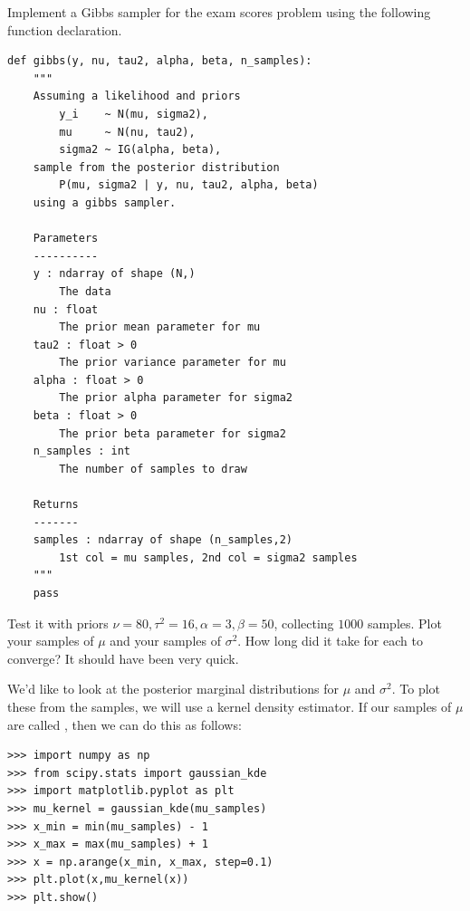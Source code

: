 \begin{problem}
Implement a Gibbs sampler for the exam scores problem using the following function declaration.
\begin{lstlisting}
def gibbs(y, nu, tau2, alpha, beta, n_samples):
    """
    Assuming a likelihood and priors
        y_i    ~ N(mu, sigma2),
        mu     ~ N(nu, tau2),
        sigma2 ~ IG(alpha, beta),
    sample from the posterior distribution
        P(mu, sigma2 | y, nu, tau2, alpha, beta)
    using a gibbs sampler.

    Parameters
    ----------
    y : ndarray of shape (N,)
        The data
    nu : float
        The prior mean parameter for mu
    tau2 : float > 0
        The prior variance parameter for mu
    alpha : float > 0
        The prior alpha parameter for sigma2
    beta : float > 0
        The prior beta parameter for sigma2
    n_samples : int
        The number of samples to draw

    Returns
    -------
    samples : ndarray of shape (n_samples,2)
        1st col = mu samples, 2nd col = sigma2 samples
    """
    pass
\end{lstlisting}
Test it with priors $\nu=80, \tau^{2} = 16, \alpha = 3, \beta = 50$, collecting $1000$ samples. Plot your samples of $\mu$ and your samples of $\sigma^{2}$. How long did it take for each to converge? It should have been very quick.
\end{problem}

We'd like to look at the posterior marginal distributions for $\mu$ and $\sigma^2$.
To plot these from the samples, we will use a kernel density estimator.
If our samples of $\mu$ are called , then we can do this as follows:
\begin{lstlisting}
>>> import numpy as np
>>> from scipy.stats import gaussian_kde
>>> import matplotlib.pyplot as plt
>>> mu_kernel = gaussian_kde(mu_samples)
>>> x_min = min(mu_samples) - 1
>>> x_max = max(mu_samples) + 1
>>> x = np.arange(x_min, x_max, step=0.1)
>>> plt.plot(x,mu_kernel(x))
>>> plt.show()
\end{lstlisting}

